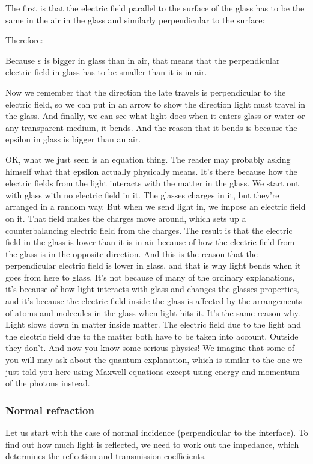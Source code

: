 	The first is that the electric field parallel to the surface of the glass has to be the same in the air in the glass and similarly  perpendicular to the surface:
	
	Therefore:
	
	Because $\varepsilon$ is bigger in glass than in air, that means that the perpendicular electric field in glass has to be smaller than it is in air. 

	Now we remember that the direction the late travels is perpendicular to the electric field, so we can put in an arrow to show the direction light must travel in the glass. And finally, we can see what light does when it enters glass or water or any transparent medium, it bends. And the reason that it bends is because the epsilon in glass is bigger than an air. 

	OK, what we just seen is an equation thing. The reader may probably asking himself what that epsilon actually physically means. It's there because how the electric fields from the light interacts with the matter in the glass. We start out with glass with no electric field in it. The glasses charges in it, but they're arranged in a random way. But when we send light in, we impose an electric field on it. That field makes the charges move around, which sets up a counterbalancing electric field from the charges. The result is that the electric field in the glass is lower than it is in air because of how the electric field from the glass is in the opposite direction. And this is the reason that the perpendicular electric field is lower in glass, and that is why light bends when it goes from here to glass. It's not because of many of the ordinary explanations, it's because of how light interacts with glass and changes the glasses properties, and it's because the electric field inside the glass is affected by the arrangements of atoms and molecules in the glass when light hits it. It's the same reason why. Light slows down in matter inside matter. The electric field due to the light and the electric field due to the matter both have to be taken into account. Outside they don't. And now you know some serious physics! We imagine that some of you will may ask about the quantum explanation, which is similar to the one we just told you here using Maxwell equations except using energy and momentum of the photons instead.
	
	\pagebreak
	\subsubsection{Normal refraction}
	Let us start with the case of normal incidence (perpendicular to the interface). To find out how much light is reflected, we need to work out the impedance, which determines the reflection and transmission coefficients.
	
